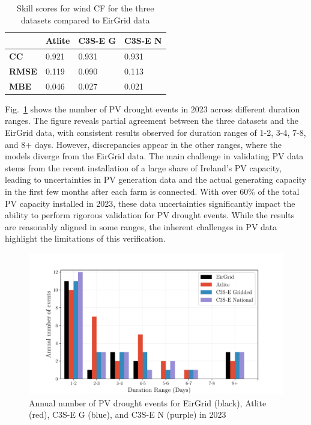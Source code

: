 \documentclass[a4paper, 11pt]{article}
\begin{document}
\begin{table}[!ht]
	\centering
	\begin{tabular}{l|lll|}
	\cline{2-4}
	& \textbf{Atlite} & \textbf{C3S-E G} & \textbf{C3S-E N} \\ \hline
	\multicolumn{1}{|l|}{\textbf{CC}}   & 0.921           & 0.931            & 0.931            \\ \hline
	\multicolumn{1}{|l|}{\textbf{RMSE}} & 0.119           & 0.090            & 0.113            \\ \hline
	\multicolumn{1}{|l|}{\textbf{MBE}}   & 0.046           & 0.027           & 0.021           \\ \hline
	\end{tabular}
	\caption{Skill scores for wind CF for the three datasets compared to EirGrid data}
	\label{tab:pv_skill_scores}
\end{table}

Fig.~\ref{fig:bar_number_events_verification_pv} shows the number of PV drought events in 2023 across different duration ranges. The figure reveals partial agreement between the three datasets and the EirGrid data, with consistent results observed for duration ranges of 1-2, 3-4, 7-8, and 8+ days. However, discrepancies appear in the other ranges, where the models diverge from the EirGrid data. The main challenge in validating PV data stems from the recent installation of a large share of Ireland’s PV capacity, leading to uncertainties in PV generation data and the actual generating capacity in the first few months after each farm is connected. With over 60\% of the total PV capacity installed in 2023, these data uncertainties significantly impact the ability to perform rigorous validation for PV drought events. While the results are reasonably aligned in some ranges, the inherent challenges in PV data highlight the limitations of this verification.

\begin{figure}[!ht]
	\centering
	\includegraphics[width=\textwidth]{verification_pv_bar}
	\caption{Annual number of PV drought events for EirGrid (black), Atlite (red), C3S-E G (blue), and C3S-E N (purple) in 2023}
	\label{fig:bar_number_events_verification_pv}
\end{figure}
\end{document}
